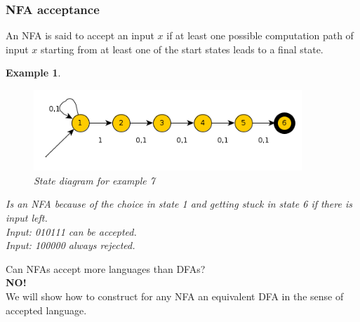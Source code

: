 \documentclass[a4paper]{article}
\newtheorem{example}{Example}
\begin{document}
\subsubsection{NFA acceptance}
An NFA is said to accept an input $x$ if at least one possible computation
path of input $x$ starting from at least one of the start states leads to a
final state.
\begin{example}
    \begin{figure}[H]
        \centering
        \includegraphics[width=0.9\textwidth]{nfa2.png}
        \caption{State diagram for example 7}
    \end{figure}
    Is an NFA because of the choice in state 1 and getting stuck in state 6 if
    there is input left.\\
    Input: 010111 can be accepted.\\
    Input: 100000 always rejected.
\end{example}
Can NFAs accept more languages than DFAs?\\
\textbf{NO!}\\
We will show how to construct for any NFA an equivalent DFA in the sense of
accepted language.
\end{document}
